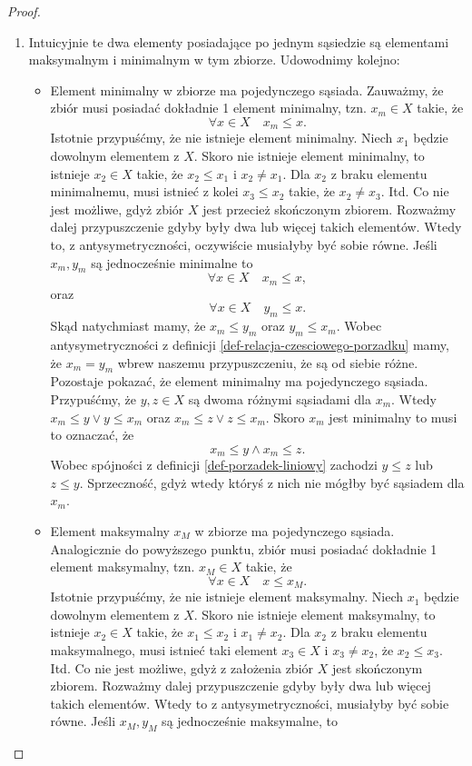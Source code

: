 \documentclass[12pt,a4paper]{report}
\begin{document}
\begin{proof}
\begin{enumerate}
\item Intuicyjnie te dwa elementy posiadające po jednym sąsiedzie są elementami maksymalnym i minimalnym w tym zbiorze. Udowodnimy kolejno:
\begin{itemize}
\item Element minimalny w zbiorze ma pojedynczego sąsiada. Zauważmy, że zbiór musi posiadać dokładnie 1 element minimalny, tzn. $x_m \in X$ takie, że 
$$
\forall x \in X \quad x_m \leq x.
$$
Istotnie przypuśćmy, że nie istnieje element minimalny. Niech $x_1$ będzie dowolnym elementem z $X$. Skoro nie istnieje element minimalny, to istnieje $x_2 \in X$ takie, że $x_2 \leq x_1$ i $x_2 \neq x_1$. Dla $x_2$ z braku elementu minimalnemu, musi istnieć z kolei $x_3 \leq x_2$ takie, że $x_2 \neq x_3$. Itd. Co nie jest możliwe, gdyż zbiór $X$ jest przecież skończonym zbiorem.
Rozważmy dalej przypuszczenie gdyby były dwa lub więcej takich elementów. Wtedy to, z antysymetryczności, oczywiście musiałyby być sobie równe. Jeśli $x_m, y_m$ są jednocześnie minimalne to
$$
\forall x \in X \quad x_m \leq x,
$$
oraz 
$$
\forall x \in X \quad y_m \leq x.
$$
Skąd natychmiast mamy, że $ x_m \leq y_m$ oraz $y_m \leq x_m$. Wobec antysymetryczności z definicji \ref{def-relacja-czesciowego-porzadku} mamy, że $x_m = y_m$ wbrew naszemu przypuszczeniu, że są od siebie różne.
Pozostaje pokazać, że element minimalny ma pojedynczego sąsiada. Przypuśćmy, że $y,z \in X$ są dwoma różnymi sąsiadami dla $x_m$. Wtedy $ x_m \leq y \lor y \leq x_m$ oraz $ x_m \leq z \lor z \leq x_m$. Skoro $x_m$ jest minimalny to musi to oznaczać, że
$$
x_m \leq y \land x_m \leq z.
$$ 
Wobec spójności z definicji \ref{def-porzadek-liniowy} zachodzi $y \leq z$ lub $z \leq y$. Sprzeczność, gdyż wtedy któryś z nich nie mógłby być sąsiadem dla $x_m$.
\item Element maksymalny $x_M$ w zbiorze ma pojedynczego sąsiada. Analogicznie do powyższego punktu, zbiór musi posiadać dokładnie 1 element maksymalny, tzn. $x_M \in X$ takie, że
$$\forall x \in X \quad x \leq x_M.$$
Istotnie przypuśćmy, że nie istnieje element maksymalny. Niech $x_1$ będzie dowolnym elementem z $X$. Skoro nie istnieje element maksymalny, to istnieje $x_2 \in X$ takie, że $x_1 \leq x_2$ i $x_1 \neq x_2$. Dla $x_2$ z braku elementu maksymalnego, musi istnieć taki element $x_3 \in X$ i $x_3 \neq x_2$, że $x_2 \leq x_3$. Itd. Co nie jest możliwe, gdyż z założenia zbiór $X$ jest skończonym zbiorem.
Rozważmy dalej przypuszczenie gdyby były dwa lub więcej takich elementów. Wtedy to z antysymetryczności, musiałyby być sobie równe. Jeśli $x_M, y_M$ są jednocześnie maksymalne, to 

\end{itemize}
\end{enumerate}
\end{proof}
\end{document}

